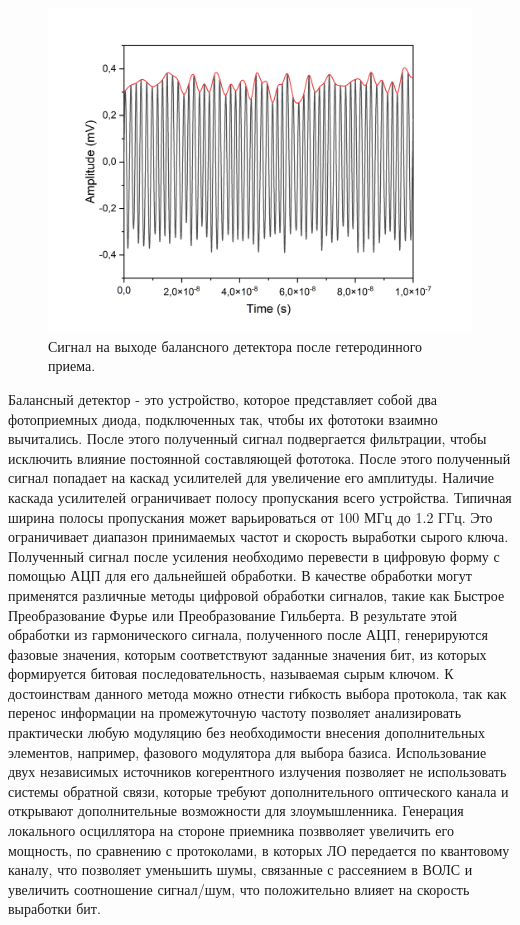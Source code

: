 \begin{figure}
    \centering
    \includegraphics[width=\textwidth]{images/balanced output heterodyne.png}
    \caption{Сигнал на выходе балансного детектора после гетеродинного приема.}
    \label{fig:het time output}
\end{figure}
\newline Балансный детектор - это устройство, которое  представляет собой два фотоприемных диода, подключенных так, чтобы их фототоки взаимно вычитались. После этого полученный сигнал подвергается фильтрации, чтобы исключить влияние постоянной составляющей фототока. После этого полученный сигнал попадает на каскад усилителей для увеличение его амплитуды. Наличие каскада усилителей ограничивает полосу пропускания всего устройства. Типичная ширина полосы пропускания может варьироваться от 100 МГц до 1.2 ГГц. Это ограничивает диапазон принимаемых частот и скорость выработки сырого ключа. 
\newline Полученный сигнал после усиления необходимо перевести в цифровую форму с помощью АЦП для его дальнейшей обработки. В качестве обработки могут применятся различные методы цифровой обработки сигналов, такие как Быстрое Преобразование Фурье или Преобразование Гильберта. В результате этой обработки из гармонического сигнала, полученного после АЦП, генерируются фазовые значения, которым соответствуют заданные значения бит, из которых формируется битовая последовательность, называемая сырым ключом. 
\newline К достоинствам данного метода можно отнести гибкость выбора протокола, так как перенос информации на промежуточную частоту позволяет анализировать практически любую модуляцию без необходимости внесения дополнительных элементов, например, фазового модулятора для выбора базиса. Использование двух независимых источников когерентного излучения позволяет не использовать системы обратной связи, которые требуют дополнительного оптического канала и открывают дополнительные возможности для злоумышленника. Генерация локального осциллятора на стороне приемника позвволяет увеличить его мощность, по сравнению с протоколами, в которых ЛО передается по квантовому каналу, что позволяет уменьшить шумы, связанные с рассеянием в ВОЛС и увеличить соотношение сигнал/шум, что положительно влияет на скорость выработки бит. 
